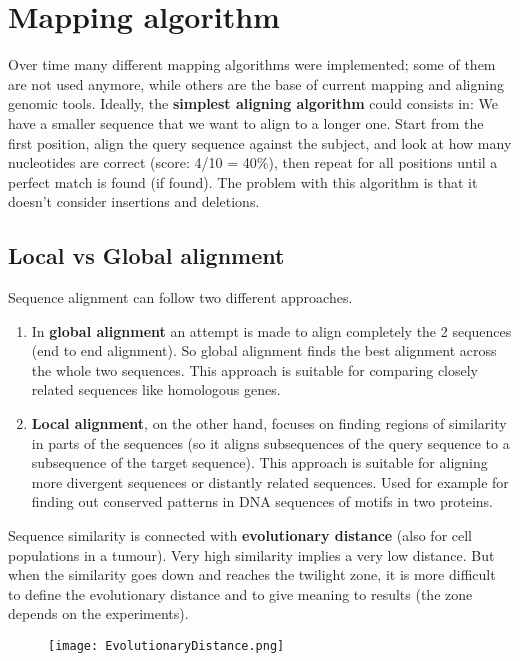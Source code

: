 \section{Mapping algorithm}

Over time many different mapping algorithms were implemented; some of them are not used anymore, while others are the base of current mapping and aligning genomic tools. 
Ideally, the \textbf{simplest aligning algorithm} could consists in:  
We have a smaller sequence that we want to align to a longer one. Start from the first position, align the query sequence against the subject, and look at how many nucleotides are correct (score: 4/10 = 40$\%$), then repeat for all positions until a perfect match is found (if found). The problem with this algorithm is that it doesn't consider insertions and deletions.

\subsection{Local vs Global alignment}
Sequence alignment can follow two different approaches.

\begin{enumerate}
    \item In \textbf{global alignment} an attempt is made to align completely the 2 sequences (end to end alignment). So global alignment finds the best alignment across the whole two sequences. This approach is suitable for comparing closely related sequences like homologous genes. 
    \item \textbf{Local alignment}, on the other hand, focuses on finding regions of similarity in parts of the sequences (so it aligns subsequences of the query sequence to a subsequence of the target sequence). This approach is suitable for aligning more divergent sequences or distantly related sequences. Used for example for finding out conserved patterns in DNA sequences of motifs in two proteins.
\end{enumerate}

Sequence similarity is connected with \textbf{evolutionary distance} (also for cell populations in a tumour). Very high similarity implies a very low distance. But when the similarity goes down and reaches the twilight zone, it is more difficult to define the evolutionary distance and to give meaning to results (the zone depends on the experiments).

\begin{figure}[h]
\centering
\texttt{[image: EvolutionaryDistance.png]}
\caption{}
\end{figure}

